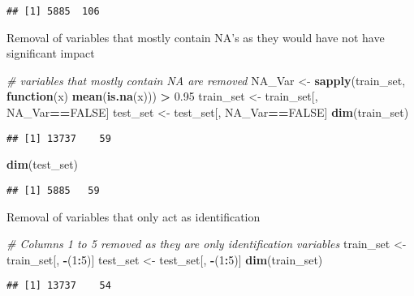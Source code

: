 \documentclass[]{article}
\newenvironment{Shaded}{\begin{snugshade}}{\end{snugshade}}
\newcommand{\KeywordTok}[1]{\textcolor[rgb]{0.13,0.29,0.53}{\textbf{#1}}}
\newcommand{\DecValTok}[1]{\textcolor[rgb]{0.00,0.00,0.81}{#1}}
\newcommand{\FloatTok}[1]{\textcolor[rgb]{0.00,0.00,0.81}{#1}}
\newcommand{\StringTok}[1]{\textcolor[rgb]{0.31,0.60,0.02}{#1}}
\newcommand{\CommentTok}[1]{\textcolor[rgb]{0.56,0.35,0.01}{\textit{#1}}}
\newcommand{\OtherTok}[1]{\textcolor[rgb]{0.56,0.35,0.01}{#1}}
\newcommand{\ControlFlowTok}[1]{\textcolor[rgb]{0.13,0.29,0.53}{\textbf{#1}}}
\newcommand{\OperatorTok}[1]{\textcolor[rgb]{0.81,0.36,0.00}{\textbf{#1}}}
\newcommand{\NormalTok}[1]{#1}
\begin{document}
\begin{verbatim}
## [1] 5885  106
\end{verbatim}

Removal of variables that mostly contain NA's as they would have not
have significant impact

\begin{Shaded}
\begin{Highlighting}[]
\CommentTok{# variables that mostly contain NA are removed }
\NormalTok{NA_Var    <-}\StringTok{ }\KeywordTok{sapply}\NormalTok{(train_set, }\ControlFlowTok{function}\NormalTok{(x) }\KeywordTok{mean}\NormalTok{(}\KeywordTok{is.na}\NormalTok{(x))) }\OperatorTok{>}\StringTok{ }\FloatTok{0.95}
\NormalTok{train_set <-}\StringTok{ }\NormalTok{train_set[, NA_Var}\OperatorTok{==}\OtherTok{FALSE}\NormalTok{]}
\NormalTok{test_set  <-}\StringTok{ }\NormalTok{test_set[, NA_Var}\OperatorTok{==}\OtherTok{FALSE}\NormalTok{]}
\KeywordTok{dim}\NormalTok{(train_set)}
\end{Highlighting}
\end{Shaded}

\begin{verbatim}
## [1] 13737    59
\end{verbatim}

\begin{Shaded}
\begin{Highlighting}[]
\KeywordTok{dim}\NormalTok{(test_set)}
\end{Highlighting}
\end{Shaded}

\begin{verbatim}
## [1] 5885   59
\end{verbatim}

Removal of variables that only act as identification

\begin{Shaded}
\begin{Highlighting}[]
\CommentTok{# Columns 1 to 5 removed as they are only identification variables }
\NormalTok{train_set <-}\StringTok{ }\NormalTok{train_set[, }\OperatorTok{-}\NormalTok{(}\DecValTok{1}\OperatorTok{:}\DecValTok{5}\NormalTok{)]}
\NormalTok{test_set  <-}\StringTok{ }\NormalTok{test_set[, }\OperatorTok{-}\NormalTok{(}\DecValTok{1}\OperatorTok{:}\DecValTok{5}\NormalTok{)]}
\KeywordTok{dim}\NormalTok{(train_set)}
\end{Highlighting}
\end{Shaded}

\begin{verbatim}
## [1] 13737    54
\end{verbatim}
\end{document}
